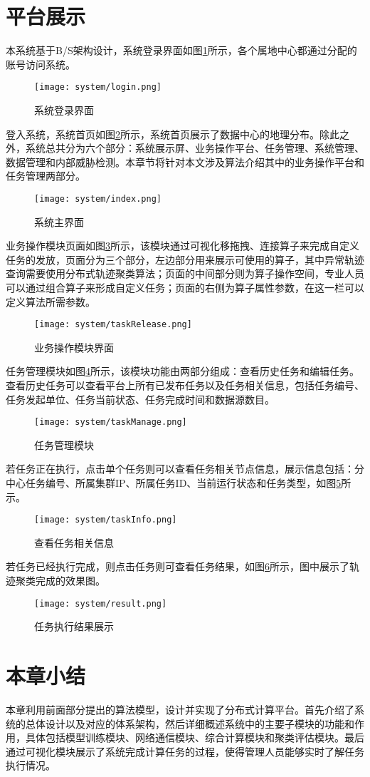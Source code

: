 \section{平台展示}

本系统基于B/S架构设计，系统登录界面如图\ref{login}所示，各个属地中心都通过分配的账号访问系统。
\begin{figure}[H]
	\texttt{[image: system/login.png]}
	\caption{系统登录界面}
	\label{login}
\end{figure}


登入系统，系统首页如图\ref{index}所示，系统首页展示了数据中心的地理分布。除此之外，系统总共分为六个部分：系统展示屏、业务操作平台、任务管理、系统管理、数据管理和内部威胁检测。本章节将针对本文涉及算法介绍其中的业务操作平台和任务管理两部分。
\begin{figure}[H]
	\texttt{[image: system/index.png]}
	\caption{系统主界面}
	\label{index}
\end{figure}

业务操作模块页面如图\ref{taskRelease3}所示，该模块通过可视化移拖拽、连接算子来完成自定义任务的发放，页面分为三个部分，左边部分用来展示可使用的算子，其中异常轨迹查询需要使用分布式轨迹聚类算法；页面的中间部分则为算子操作空间，专业人员可以通过组合算子来形成自定义任务；页面的右侧为算子属性参数，在这一栏可以定义算法所需参数。
\begin{figure}[H]
	\texttt{[image: system/taskRelease.png]}
	\caption{业务操作模块界面}
	\label{taskRelease3}
\end{figure}

任务管理模块如图\ref{taskManage}所示，该模块功能由两部分组成：查看历史任务和编辑任务。查看历史任务可以查看平台上所有已发布任务以及任务相关信息，包括任务编号、任务发起单位、任务当前状态、任务完成时间和数据源数目。
\begin{figure}[H]
	\texttt{[image: system/taskManage.png]}
	\caption{任务管理模块}
	\label{taskManage}
\end{figure}

若任务正在执行，点击单个任务则可以查看任务相关节点信息，展示信息包括：分中心任务编号、所属集群IP、所属任务ID、当前运行状态和任务类型，如图\ref{taskInfo}所示。
\begin{figure}[H]
	\texttt{[image: system/taskInfo.png]}
	\caption{查看任务相关信息}
	\label{taskInfo}
\end{figure}

若任务已经执行完成，则点击任务则可查看任务结果，如图\ref{result}所示，图中展示了轨迹聚类完成的效果图。
\begin{figure}[H]
	\texttt{[image: system/result.png]}
	\caption{任务执行结果展示}
	\label{result}
\end{figure}

\section{本章小结}

本章利用前面部分提出的算法模型，设计并实现了分布式计算平台。首先介绍了系统的总体设计以及对应的体系架构，然后详细概述系统中的主要子模块的功能和作用，具体包括模型训练模块、网络通信模块、综合计算模块和聚类评估模块。最后通过可视化模块展示了系统完成计算任务的过程，使得管理人员能够实时了解任务执行情况。